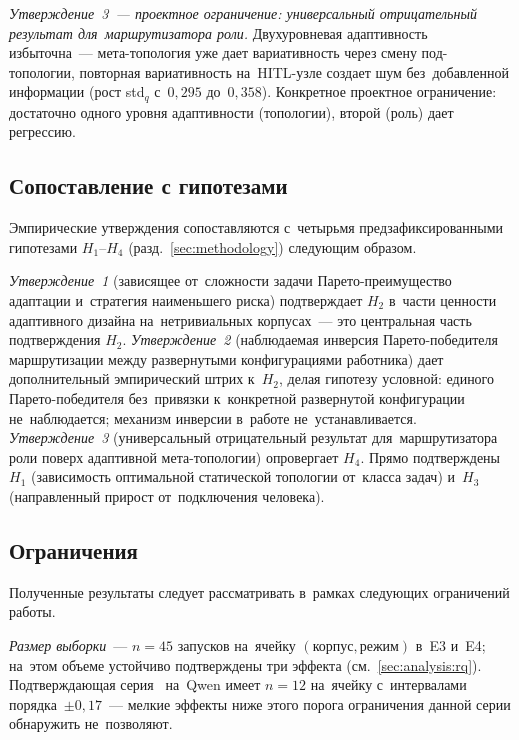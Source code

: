 \emph{Утверждение~3~--- проектное ограничение: универсальный
отрицательный результат для~маршрутизатора роли.} Двухуровневая
адаптивность избыточна~--- мета-топология уже дает вариативность
через смену под-топологии, повторная вариативность на~HITL-узле
создает шум без~добавленной информации (рост std$_q$ с~$0{,}295$
до~$0{,}358$). Конкретное проектное ограничение: достаточно одного
уровня адаптивности (топологии), второй (роль) дает регрессию.

\subsection{Сопоставление с гипотезами}
\label{sec:analysis:hyp}

Эмпирические утверждения сопоставляются с~четырьмя предзафиксированными
гипотезами $H_1$--$H_4$ (разд.~\ref{sec:methodology}) следующим образом.

\emph{Утверждение~1} (зависящее от~сложности задачи Парето-преимущество
адаптации и~стратегия наименьшего риска) подтверждает $H_2$ в~части
ценности адаптивного дизайна на~нетривиальных корпусах~--- это
центральная часть подтверждения $H_2$. \emph{Утверждение~2}
(наблюдаемая инверсия Парето-победителя маршрутизации между
развернутыми конфигурациями работника) дает дополнительный
эмпирический штрих к~$H_2$, делая гипотезу условной: единого
Парето-победителя без~привязки к~конкретной развернутой конфигурации
не~наблюдается; механизм инверсии в~работе не~устанавливается.
\emph{Утверждение~3} (универсальный отрицательный результат
для~маршрутизатора роли поверх адаптивной мета-топологии) опровергает
$H_4$. Прямо подтверждены $H_1$ (зависимость оптимальной статической
топологии от~класса задач) и~$H_3$ (направленный прирост от~подключения
человека).

\subsection{Ограничения}
\label{sec:analysis:threats}

Полученные результаты следует рассматривать в~рамках следующих
ограничений работы.

\emph{Размер выборки}~--- $n=45$ запусков на~ячейку
$(\text{корпус},\text{режим})$ в~E3 и~E4; на~этом объеме устойчиво
подтверждены три эффекта (см.~\ref{sec:analysis:rq}). Подтверждающая
серия~ на~Qwen имеет $n=12$ на~ячейку с~интервалами
порядка~$\pm0{,}17$~--- мелкие эффекты ниже этого порога ограничения
данной серии обнаружить не~позволяют.

